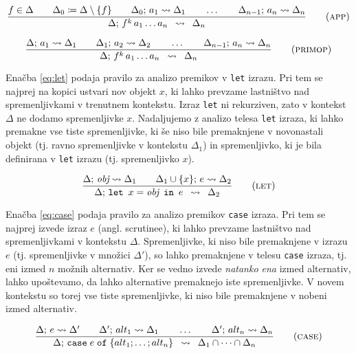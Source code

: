 \begin{equation}
\infers[app]{
    f \in \Delta \qquad \Delta_0 \coloneqq \Delta \setminus \{ f \} \qquad \Delta_0; \, a_1 \leadsto \Delta_1 \qquad \dots \qquad \Delta_{n-1}; \, a_n \leadsto \Delta_n
}{
    \Delta; \, f^k \, a_1 \dots a_n
}{
	\Delta_n
}
\label{eq:app}
\end{equation}

\begin{equation}
\infers[primop]{
    \Delta; \, a_1 \leadsto \Delta_1 \qquad \Delta_1; \, a_2 \leadsto \Delta_2 \qquad\dots \qquad \Delta_{n-1}; \, a_n \leadsto \Delta_n
}{
    \Delta; \, f^k \, a_1 \dots a_n
}{
	\Delta_n
}
\label{eq:primop}
\end{equation}

Enačba \ref{eq:let} podaja pravilo za analizo premikov v \texttt{let} izrazu. Pri tem se najprej na kopici ustvari nov objekt $x$, ki lahko prevzame lastništvo nad spremenljivkami v trenutnem kontekstu. Izraz \texttt{let} ni rekurziven, zato v kontekst $\Delta$ ne dodamo spremenljivke $x$. Nadaljujemo z analizo telesa \texttt{let} izraza, ki lahko premakne vse tiste spremenljivke, ki še niso bile premaknjene v novonastali objekt (tj. ravno spremenljivke v kontekstu $\Delta_1$) in spremenljivko, ki je bila definirana v \texttt{let} izrazu (tj. spremenljivko $x$).

\begin{equation}
\infers[let]{
    \Delta; \, \textit{obj} \leadsto \Delta_1
    \qquad
    \Delta_1 \cup \{ x \}; \, e \leadsto \Delta_2
}{
    \Delta; \, \texttt{let} \enspace x = \textit{obj} \enspace \texttt{in} \enspace e
}{
	\Delta_2
}
\label{eq:let}
\end{equation}

Enačba \ref{eq:case} podaja pravilo za analizo premikov \texttt{case} izraza. Pri tem se najprej izvede izraz $e$ (angl. scrutinee), ki lahko prevzame lastništvo nad spremenljivkami v kontekstu $\Delta$. Spremenljivke, ki niso bile premaknjene v izrazu $e$ (tj. spremenljivke v množici $\Delta'$), so lahko premaknjene v telesu \texttt{case} izraza, tj. eni izmed $n$ možnih alternativ. Ker se vedno izvede \emph{natanko ena} izmed alternativ, lahko upoštevamo, da lahko alternative premaknejo iste spremenljivke. V novem kontekstu so torej vse tiste spremenljivke, ki niso bile premaknjene v nobeni izmed alternativ.

\begin{equation}
\infers[case]{
    \Delta; \, e \leadsto \Delta' \qquad \Delta'; \, alt_1 \leadsto \Delta_1 \qquad \dots \qquad \Delta'; \, alt_n \leadsto \Delta_n
}{
    \Delta; \, \texttt{case} \; e \; \texttt{of} \; \{ alt_1; \dots; alt_n \}
}{
	\Delta_1 \cap \dots \cap \Delta_n
}
\label{eq:case}
\end{equation}

